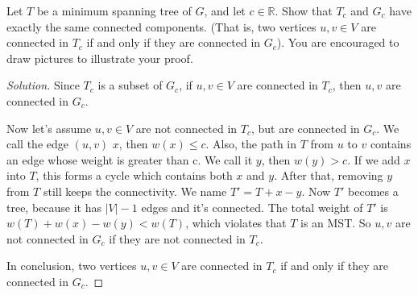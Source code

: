 \usepackage{amsfonts}




    \maketitle

    \begin{thm}{}{}
        Let $T$ be a minimum spanning tree of $G$, and let $c\in \mathbb{R}$.
        Show that $T_c$ and $G_c$ have exactly the same connected components. (That is, two vertices $u,v\in V$ are connected in $T_c$ if and only if they are connected in $G_c$).
        You are encouraged to draw pictures to illustrate your proof.
    \end{thm}
    \begin{proof}[Solution]
        Since $T_c$ is a subset of $G_c$, if $u,v\in V$ are connected in $T_c$, then $u,v$ are connected in $G_c$.
        
        Now let's assume $u,v\in V$ are not connected in $T_c$, but are connected in $G_c$.
        We call the edge $(u,v)$ $x$, then $w(x)\leq c$.
        Also, the path in $T$ from $u$ to $v$ contains an edge whose weight is greater than c.
        We call it $y$, then $w(y)>  c$.
        If we add $x$ into $T$, this forms a cycle which contains both $x$ and $y$.
        After that, removing $y$ from $T$ still keeps the connectivity.
        We name $T'=T+x-y$.
        Now $T'$ becomes a tree, because it has $|V|-1$ edges and it's connected.
        The total weight of  $T'$ is $w(T)+w(x)-w(y)<w(T)$, which violates that $T$ is an MST\@.
        So $u,v$ are not connected in $G_c$ if they are not connected in $T_c$.

        In conclusion, two vertices $u,v\in V$ are connected in $T_c$ if and only if they are connected in $G_c$.
    \end{proof}




